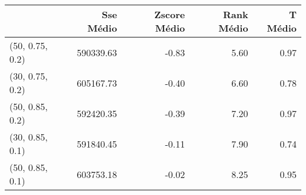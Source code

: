 \begin{table}
\centering
\label{tab:train_bests_Genetic}
\begin{tabular}{lrrrr}
\toprule
{} &  Sse Médio &  Zscore Médio &  Rank Médio &  T Médio \\
\midrule
(50, 0.75, 0.2) &  590339.63 &         -0.83 &        5.60 &     0.97 \\
(30, 0.75, 0.2) &  605167.73 &         -0.40 &        6.60 &     0.78 \\
(50, 0.85, 0.2) &  592420.35 &         -0.39 &        7.20 &     0.97 \\
(30, 0.85, 0.1) &  591840.45 &         -0.11 &        7.90 &     0.74 \\
(50, 0.85, 0.1) &  603753.18 &         -0.02 &        8.25 &     0.95 \\
\bottomrule
\end{tabular}
\end{table}
